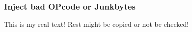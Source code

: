 \subsubsection{Inject bad OPcode or Junkbytes} \label{subsubsection:evaluation-reengineering-break-inject}
This is my real text! Rest might be copied or not be checked!
